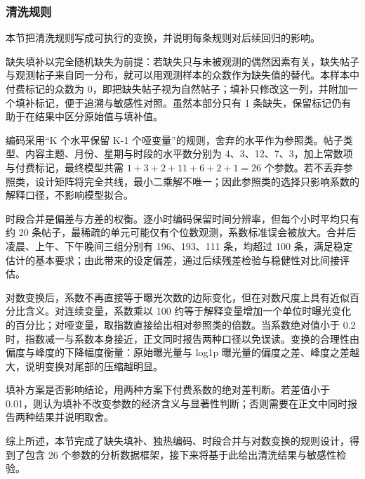 \subsubsection{清洗规则}

本节把清洗规则写成可执行的变换，并说明每条规则对后续回归的影响。

缺失填补以完全随机缺失为前提：若缺失只与未被观测的偶然因素有关，缺失帖子与观测帖子来自同一分布，就可以用观测样本的众数作为缺失值的替代。本样本中付费标记的众数为 0，即把缺失帖子视为自然帖子；填补只修改这一列，并附加一个填补标记，便于追溯与敏感性对照。虽然本部分只有 1 条缺失，保留标记仍有助于在结果中区分原始值与填补值。

编码采用“K 个水平保留 K-1 个哑变量”的规则，舍弃的水平作为参照类。帖子类型、内容主题、月份、星期与时段的水平数分别为 4、3、12、7、3，加上常数项与付费标记，最终模型共需 $1+3+2+11+6+2+1=26$ 个参数。若不丢弃参照类，设计矩阵将完全共线，最小二乘解不唯一；因此参照类的选择只影响系数的解释口径，不影响模型拟合。

时段合并是偏差与方差的权衡。逐小时编码保留时间分辨率，但每个小时平均只有约 20 条帖子，最稀疏的单元可能仅有个位数观测，系数标准误会被放大。合并后凌晨、上午、下午晚间三组分别有 196、193、111 条，均超过 100 条，满足稳定估计的基本要求；由此带来的设定偏差，通过后续残差检验与稳健性对比间接评估。

对数变换后，系数不再直接等于曝光次数的边际变化，但在对数尺度上具有近似百分比含义。对连续变量，系数乘以 100 约等于解释变量增加一个单位时曝光变化的百分比；对哑变量，取指数直接给出相对参照类的倍数。当系数绝对值小于 0.2 时，指数减一与系数本身接近，正文同时报告两种口径以免误读。变换的合理性由偏度与峰度的下降幅度衡量：原始曝光量与 log1p 曝光量的偏度之差、峰度之差越大，说明变换对尾部的压缩越明显。

填补方案是否影响结论，用两种方案下付费系数的绝对差判断。若差值小于 0.01，则认为填补不改变参数的经济含义与显著性判断；否则需要在正文中同时报告两种结果并说明取舍。

综上所述，本节完成了缺失填补、独热编码、时段合并与对数变换的规则设计，得到了包含 26 个参数的分析数据框架，接下来将基于此给出清洗结果与敏感性检验。
